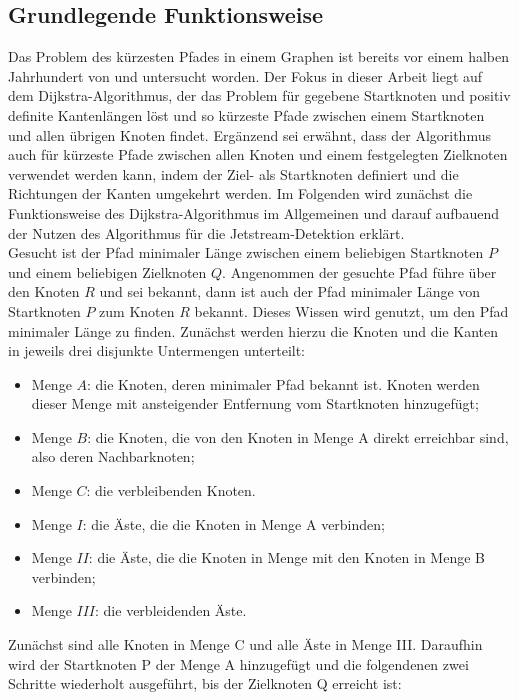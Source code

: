 \subsection{Grundlegende Funktionsweise}
Das Problem des kürzesten Pfades in einem Graphen ist bereits vor einem halben Jahrhundert von \citet{kruskal-1956} und \citet{dijkstra-1959} untersucht worden. Der Fokus in dieser Arbeit liegt auf dem Dijkstra-Al\-go\-rith\-mus, der das Problem für gegebene Startknoten und positiv definite Kantenlängen löst und so kürzeste Pfade zwischen einem Startknoten und allen übrigen Knoten findet. Ergänzend sei erwähnt, dass der Algorithmus auch für kürzeste Pfade zwischen allen Knoten und einem festgelegten Zielknoten verwendet werden kann, indem der Ziel- als Startknoten definiert und die Richtungen der Kanten umgekehrt werden. Im Folgenden wird zunächst die Funktionsweise des Dijkstra-Algorithmus im Allgemeinen und darauf aufbauend der Nutzen des Algorithmus für die Jetstream-Detektion erklärt.
\\
Gesucht ist der Pfad minimaler Länge zwischen einem beliebigen Startknoten $P$ und einem beliebigen Zielknoten $Q$. Angenommen der gesuchte Pfad führe über den Knoten $R$ und sei bekannt, dann ist auch der Pfad minimaler Länge von Startknoten $P$ zum Knoten $R$ bekannt. Dieses Wissen wird genutzt, um den Pfad minimaler Länge zu finden. Zunächst werden hierzu die Knoten und die Kanten in jeweils drei disjunkte Untermengen unterteilt:
\begin{itemize}
  \item Menge $A$: die Knoten, deren minimaler Pfad bekannt ist. Knoten werden dieser Menge mit ansteigender Entfernung vom Startknoten hinzugefügt;
  \item Menge $B$: die Knoten, die von den Knoten in Menge A direkt erreichbar sind, also deren Nachbarknoten;
  \item Menge $C$: die verbleibenden Knoten.
  \\
  \item Menge $I$: die Äste, die die Knoten in Menge A verbinden;
  \item Menge $II$: die Äste, die die Knoten in Menge mit den Knoten in Menge B verbinden;
  \item Menge $III$: die verbleidenden Äste.
\end{itemize}
Zunächst sind alle Knoten in Menge C und alle Äste in Menge III. Daraufhin wird der Startknoten P der Menge A hinzugefügt und die folgendenen zwei Schritte wiederholt ausgeführt, bis der Zielknoten Q erreicht ist:
